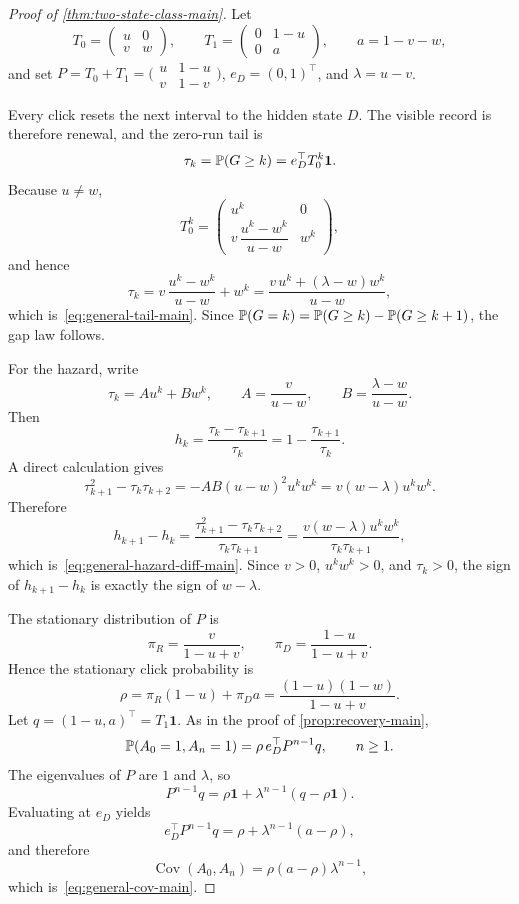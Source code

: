 \begin{proof}[Proof of \cref{thm:two-state-class-main}]
Let
\[
T_0=
\begin{pmatrix}
u & 0\\
v & w
\end{pmatrix},
\qquad
T_1=
\begin{pmatrix}
0 & 1-u\\
0 & a
\end{pmatrix},
\qquad
a=1-v-w,
\]
and set $P=T_0+T_1=\bigl(\begin{smallmatrix}u&1-u\\ v&1-v\end{smallmatrix}\bigr)$, $e_D=(0,1)^\top$, and $\lambda=u-v$.

Every click resets the next interval to the hidden state $D$. The visible record is therefore renewal, and the zero-run tail is
\[
\tau_k=\mathbb{P}(G\ge k)=e_D^\top T_0^k\mathbf 1.
\]
Because $u\neq w$,
\[
T_0^k=
\begin{pmatrix}
u^k & 0\\
v\,\dfrac{u^k-w^k}{u-w} & w^k
\end{pmatrix},
\]
and hence
\[
\tau_k=
v\,\frac{u^k-w^k}{u-w}+w^k
=
\frac{v\,u^k+(\lambda-w)w^k}{u-w},
\]
which is~\eqref{eq:general-tail-main}. Since $\mathbb{P}(G=k)=\mathbb{P}(G\ge k)-\mathbb{P}(G\ge k+1)$, the gap law follows.

For the hazard, write
\[
\tau_k=A u^k + B w^k,
\qquad
A=\frac{v}{u-w},
\qquad
B=\frac{\lambda-w}{u-w}.
\]
Then
\[
h_k
=
\frac{\tau_k-\tau_{k+1}}{\tau_k}
=
1-\frac{\tau_{k+1}}{\tau_k}.
\]
A direct calculation gives
\[
\tau_{k+1}^2-\tau_k\tau_{k+2}
=
-AB(u-w)^2u^kw^k
=
v(w-\lambda)u^kw^k.
\]
Therefore
\[
h_{k+1}-h_k
=
\frac{\tau_{k+1}^2-\tau_k\tau_{k+2}}{\tau_k\tau_{k+1}}
=
\frac{v(w-\lambda)u^kw^k}{\tau_k\tau_{k+1}},
\]
which is~\eqref{eq:general-hazard-diff-main}. Since $v>0$, $u^kw^k>0$, and $\tau_k>0$, the sign of $h_{k+1}-h_k$ is exactly the sign of $w-\lambda$.

The stationary distribution of $P$ is
\[
\pi_R=\frac{v}{1-u+v},
\qquad
\pi_D=\frac{1-u}{1-u+v}.
\]
Hence the stationary click probability is
\[
\rho=\pi_R(1-u)+\pi_Da
=
\frac{(1-u)(1-w)}{1-u+v}.
\]
Let $q=(1-u,a)^\top=T_1\mathbf 1$. As in the proof of \cref{prop:recovery-main},
\[
\mathbb{P}(A_0=1,A_n=1)=\rho\,e_D^\top P^{n-1}q,
\qquad n\ge1.
\]
The eigenvalues of $P$ are $1$ and $\lambda$, so
\[
P^{n-1}q=\rho\mathbf 1+\lambda^{n-1}(q-\rho\mathbf 1).
\]
Evaluating at $e_D$ yields
\[
e_D^\top P^{n-1}q=\rho+\lambda^{n-1}(a-\rho),
\]
and therefore
\[
\operatorname{Cov}(A_0,A_n)=\rho(a-\rho)\lambda^{n-1},
\]
which is~\eqref{eq:general-cov-main}.


\end{proof}

